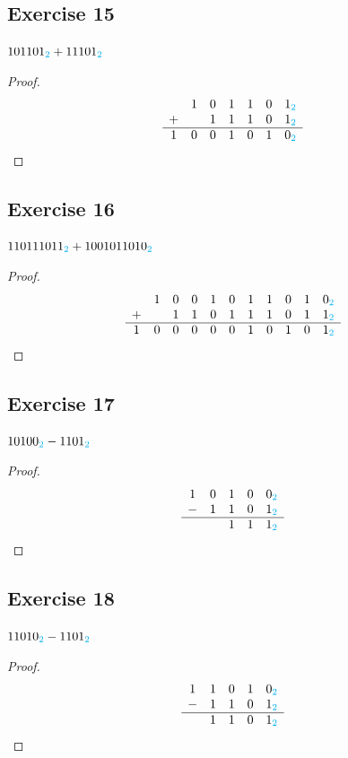 \documentclass[14pt]{extarticle}
\newcommand{\base}[1]{{\color{cyan}#1}}
\begin{document}
\subsection{Exercise 15}
$101101_\base{2} + 11101_\base{2}$

\begin{proof}
$$
\begin{array}{ccccccc}
&1&0&1&1&0&1_\base{2}\\
+&&1&1&1&0&1_\base{2}\\
\hline
1&0&0&1&0&1&0_\base{2}\\
\end{array}
$$
\end{proof}

\subsection{Exercise 16}
$110111011_\base{2} + 1001011010_\base{2}$

\begin{proof}
$$
\begin{array}{ccccccccccc}
&1&0&0&1&0&1&1&0&1&0_\base{2}\\
+&&1&1&0&1&1&1&0&1&1_\base{2}\\
\hline
1&0&0&0&0&0&1&0&1&0&1_\base{2}\\
\end{array}
$$
\end{proof}

\subsection{Exercise 17}
$10100_\base{2} - 1101_\base{2}$

\begin{proof}
$$
\begin{array}{ccccc}
1&0&1&0&0_\base{2}\\
-&1&1&0&1_\base{2}\\
\hline
& &1&1&1_\base{2}\\
\end{array}
$$
\end{proof}

\subsection{Exercise 18}
$11010_\base{2} - 1101_\base{2}$

\begin{proof}
$$
\begin{array}{ccccc}
1&1&0&1&0_\base{2}\\
-&1&1&0&1_\base{2}\\
\hline
&1&1&0&1_\base{2}\\
\end{array}
$$
\end{proof}
\end{document}

